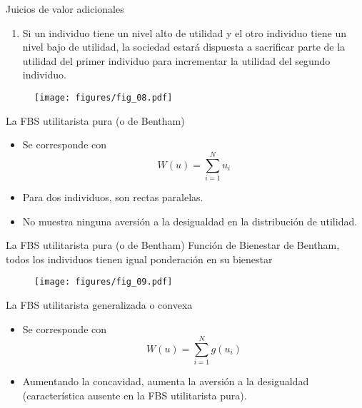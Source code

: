 \begin{frame}{Juicios de valor adicionales}
	\begin{enumerate}[3]
		\item Si un individuo tiene un nivel alto de utilidad y el otro individuo tiene un nivel bajo de utilidad, la sociedad estará dispuesta a sacrificar parte de la utilidad del primer individuo para incrementar la utilidad del segundo individuo.
	\end{enumerate}

	\begin{figure}[!h]
		\centering
		\hspace{1.2cm}\texttt{[image: figures/fig\_08.pdf]}
	\end{figure}
\end{frame}
\begin{frame}{La FBS utilitarista pura (o de Bentham)}
	\begin{itemize}
		\item Se corresponde con
					$$W(u) = \sum_{i = 1}^{N} u_i$$
		\item Para dos individuos, son rectas paralelas.
		\item No muestra ninguna aversión a la desigualdad en la distribución de utilidad.
	\end{itemize}
\end{frame}
\begin{frame}{La FBS utilitarista pura (o de Bentham)}
Función de Bienestar de Bentham, todos los individuos tienen igual ponderación en su bienestar
	\begin{figure}[!h]
		\centering
		\hspace{1.2cm}\texttt{[image: figures/fig\_09.pdf]}
	\end{figure}
\end{frame}
\begin{frame}{La FBS utilitarista generalizada o convexa}
	\begin{itemize}
		\item Se corresponde con
					$$W(u) = \sum_{i = 1}^{N} g(u_i)$$
		\item Aumentando la concavidad, aumenta la aversión a la desigualdad (característica ausente en la FBS utilitarista pura).
	\end{itemize}
\end{frame}
